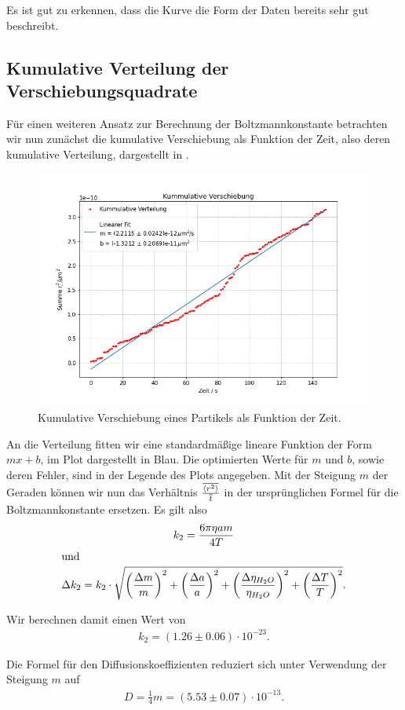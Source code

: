 Es ist gut zu erkennen, dass die Kurve die Form der Daten bereits sehr gut beschreibt.

\subsection{Kumulative Verteilung der Verschiebungsquadrate}

Für einen weiteren Ansatz zur Berechnung der Boltzmannkonstante betrachten wir nun zunächst die kumulative Verschiebung als Funktion der Zeit, also deren kumulative Verteilung, dargestellt in .

\begin{figure}[H]
  \centering
  \includegraphics[width=.90\textwidth]{files/brown3.png}
  \caption{Kumulative Verschiebung eines Partikels als Funktion der Zeit.}
  \label{fig:brown3}
\end{figure}

An die Verteilung fitten wir eine standardmäßige lineare Funktion der Form $mx + b$, im Plot dargestellt in Blau. Die optimierten Werte für $m$ und $b$, sowie deren Fehler, sind in der Legende des Plots angegeben. Mit der Steigung $m$ der Geraden können wir nun das Verhältnis $\frac{\overline{\expval{r^2}}}{\overline{t}}$ in der ursprünglichen Formel für die Boltzmannkonstante ersetzen. Es gilt also
\begin{gather}
  k_{2} = \frac{6\pi\eta a m}{4 T}\\
  \intertext{und}
  \Delta k_{2} = k_{2} \cdot \sqrt{\qty(\frac{\Delta m}{m})^{2} + \qty(\frac{\Delta a}{a})^{2} + \qty(\frac{\Delta \eta_{H_2 O}}{\eta_{H_2 O}})^{2} + \qty(\frac{\Delta T}{T})^{2}}.
\end{gather}

Wir berechnen damit einen Wert von
\begin{align}
  k_{2} = (1.26 \pm 0.06) \cdot 10^{-23}.
\end{align}

Die Formel für den Diffusionskoeffizienten reduziert sich unter Verwendung der Steigung $m$ auf
\begin{align}
  D = \frac{1}{4} m = (5.53 \pm 0.07) \cdot 10^{-13}.
\end{align}